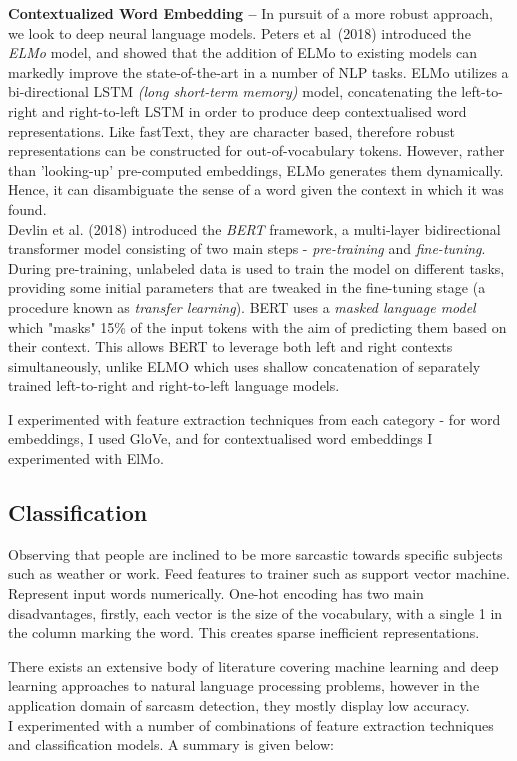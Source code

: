 \documentclass[12pt,a4paper]{article}
\begin{document}
\noindent \textbf{Contextualized Word Embedding --}
In pursuit of a more robust approach, we look to deep neural language models. Peters et al\ (2018) \cite{peters2018deep} introduced the \textit{ELMo} model, and showed that the addition of ELMo to existing models can markedly improve the state-of-the-art in a number of NLP tasks. ELMo utilizes a bi-directional LSTM \textit{(long short-term memory)} model, concatenating the left-to-right and right-to-left LSTM in order to produce deep contextualised word representations. Like fastText, they are character based, therefore robust representations can be constructed for out-of-vocabulary tokens. However, rather than 'looking-up' pre-computed embeddings, ELMo generates them dynamically. Hence, it can disambiguate the sense of a word given the context in which it was found.\\
Devlin et al. (2018) \cite{devlin2018bert} introduced the \textit{BERT} framework, a multi-layer bidirectional transformer model consisting of two main steps - \textit{pre-training} and \textit{fine-tuning}. During pre-training, unlabeled data is used to train the model on different tasks, providing some initial parameters that are tweaked in the fine-tuning stage (a procedure known as \textit{transfer learning}). BERT uses a \textit{masked language model} which "masks" 15\% of the input tokens with the aim of predicting them based on their context. This allows BERT to leverage both left and right contexts simultaneously, unlike ELMO which uses shallow concatenation of separately trained left-to-right and right-to-left language models. 

I experimented with feature extraction techniques from each category - for word embeddings, I used GloVe, and for contextualised word embeddings I experimented with ElMo.


\subsection{Classification}
\noindent 
Observing that people are inclined to be more sarcastic towards specific subjects such as weather or work.
Feed features to trainer such as support vector machine.
Represent input words numerically.
One-hot encoding has two main disadvantages, firstly, each vector is the size of the vocabulary, with a single 1 in the column marking the word. This creates sparse inefficient representations.


\noindent There exists an extensive body of literature covering machine learning and deep learning approaches to natural language processing problems, however in the application domain of sarcasm detection, they mostly display low accuracy.\\
I experimented with a number of combinations of feature extraction techniques and classification models. A summary is given below:
\end{document}
